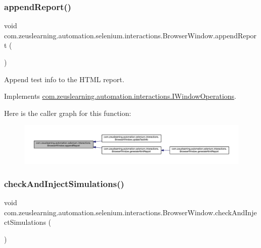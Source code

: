 \subsubsection{\texorpdfstring{append\+Report()}{appendReport()}}
{\footnotesize\ttfamily void com.\+zeuslearning.\+automation.\+selenium.\+interactions.\+Browser\+Window.\+append\+Report (\begin{DoxyParamCaption}{ }\end{DoxyParamCaption})\hspace{0.3cm}{\ttfamily [inline]}}

Append test info to the H\+T\+ML report. 

Implements \hyperlink{interfacecom_1_1zeuslearning_1_1automation_1_1interactions_1_1IWindowOperations_a86e4c8b3c5bad66a1b9d7a2bf15765c8}{com.\+zeuslearning.\+automation.\+interactions.\+I\+Window\+Operations}.

Here is the caller graph for this function\+:
\nopagebreak
\begin{figure}[H]
\begin{center}
\leavevmode
\includegraphics[width=350pt]{d8/d87/classcom_1_1zeuslearning_1_1automation_1_1selenium_1_1interactions_1_1BrowserWindow_a2a3afd6b5229d2bfaecbccd92b8a4fe9_icgraph}
\end{center}
\end{figure}
\hypertarget{classcom_1_1zeuslearning_1_1automation_1_1selenium_1_1interactions_1_1BrowserWindow_a501c3085d022ec5cd5ced4631c46eaae}{}\label{classcom_1_1zeuslearning_1_1automation_1_1selenium_1_1interactions_1_1BrowserWindow_a501c3085d022ec5cd5ced4631c46eaae} 
\subsubsection{\texorpdfstring{check\+And\+Inject\+Simulations()}{checkAndInjectSimulations()}}
{\footnotesize\ttfamily void com.\+zeuslearning.\+automation.\+selenium.\+interactions.\+Browser\+Window.\+check\+And\+Inject\+Simulations (\begin{DoxyParamCaption}{ }\end{DoxyParamCaption})\hspace{0.3cm}{\ttfamily [inline]}}

